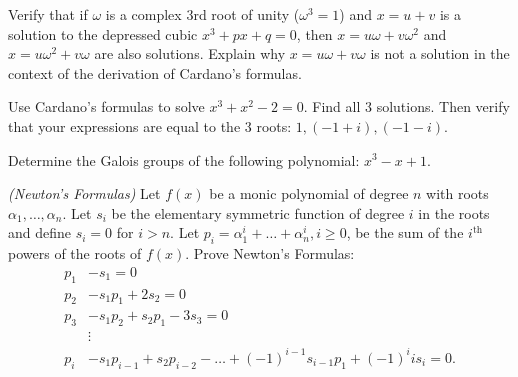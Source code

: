 \documentclass[12pt,letterpaper]{hmcpset}
\begin{document}

\begin{problem}[Problem G]
  Verify that if $\omega$ is a complex 3rd root of unity ($\omega^3 = 1$) and $x = u + v$ is a solution to the depressed cubic $x^3 + px + q = 0$, then $x = u\omega + v\omega^2$ and $x = u\omega^2 + v\omega$ are also solutions.  Explain why $x = u\omega + v\omega$  is not a solution in the context of the derivation of Cardano's formulas.
\end{problem}
\begin{solution}
  \vfill
\end{solution}
\newpage

\begin{problem}[Problem H]
Use Cardano’s formulas to solve $x^3 + x^2 -2 = 0$.  Find all 3 solutions.  Then verify that your expressions are equal to the 3 roots: $1, ( -1+ i ), (-1 - i )$.
\end{problem}
\begin{solution}
  \vfill
\end{solution}
\newpage

\begin{problem}[14.6.2c]
  Determine the Galois groups of the following polynomial: $x^3 - x + 1$.
\end{problem}
\begin{solution}
\vfill
\end{solution}
\newpage

\begin{problem}[14.6.22]
  \emph{(Newton's Formulas)} Let $f(x)$ be a monic polynomial of degree $n$ with roots $\alpha_1, \dots , \alpha_n.$ Let $s_i$ be the elementary symmetric function of degree $i$ in the roots and define $s_i = 0$ for $i > n$. Let $p_i = \alpha_1^i + \dots + \alpha_n^i, i\ge 0$, be the sum of the $i^{\text{th}}$ powers of the roots of $f(x)$. Prove Newton's Formulas:
  \begin{align*}
    p_1 &- s_1 = 0\\
    p_2 &- s_1p_1 + 2s_2 = 0\\
    p_3 &- s_1p_2 + s_2p_1 - 3s_3 = 0\\
    &\vdots\\
    p_i &- s_1p_{i-1} + s_2p_{i-2} - \dots + (-1)^{i-1}s_{i-1}p_1 + (-1)^i is_i =0.
  \end{align*}
\end{problem}
\begin{solution}
\vfill
\end{solution}
\newpage
\end{document}
